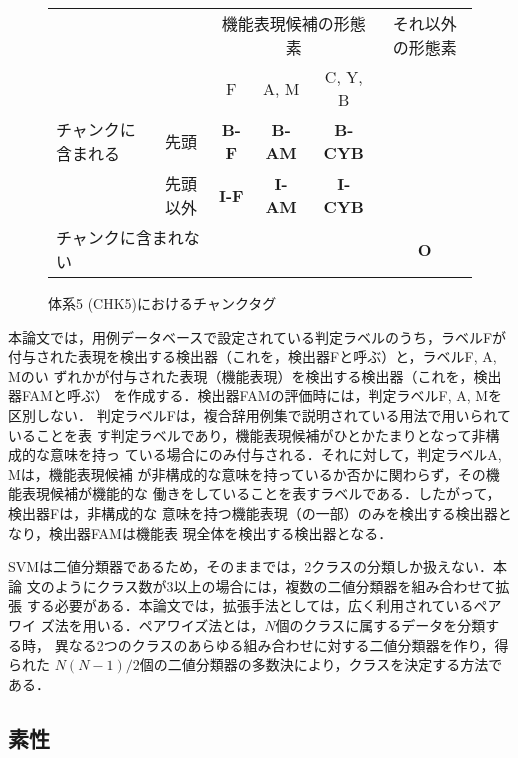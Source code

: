 \documentclass[japanese]{jnlp_1.2d}
\begin{document}
\begin{figure}
  \begin{center}
    \begin{tabular}{l|c||c|c|c|c}\hline
      \multicolumn{2}{c||}{} & \multicolumn{3}{c|}{機能表現候補の形態素} & それ以外の形態素 \\ \cline{3-5}
      \multicolumn{2}{c||}{} & F & A, M & C, Y, B & \\ \hline\hline
      チャンクに含まれる & 先頭 & {\bfseries B-F} & {\bfseries B-AM} & {\bfseries B-CYB} & \\ \cline{2-5}
      & 先頭以外 & {\bfseries I-F} & {\bfseries I-AM} & {\bfseries I-CYB} & \\ \hline
      \multicolumn{2}{l||}{チャンクに含まれない} & \multicolumn{3}{c|}{} & {\bfseries O} \\ \hline
    \end{tabular}
  \end{center}
    \vspace{8pt}
  \caption{体系5 (CHK5)におけるチャンクタグ}
  \label{fig:chunktag}
\vspace{-2pt}
\end{figure}

本論文では，用例データベースで設定されている判定ラベルのうち，ラベルFが
付与された表現を検出する検出器（これを，検出器Fと呼ぶ）と，ラベルF, A, Mのい
ずれかが付与された表現（機能表現）を検出する検出器（これを，検出器FAMと呼ぶ）
を作成する．検出器FAMの評価時には，判定ラベルF, A, Mを区別しない．
判定ラベルFは，複合辞用例集で説明されている用法で用いられていることを表
す判定ラベルであり，機能表現候補がひとかたまりとなって非構成的な意味を持っ
ている場合にのみ付与される．それに対して，判定ラベルA, Mは，機能表現候補
が非構成的な意味を持っているか否かに関わらず，その機能表現候補が機能的な
働きをしていることを表すラベルである．したがって，検出器Fは，非構成的な
意味を持つ機能表現（の一部）のみを検出する検出器となり，検出器FAMは機能表
現全体を検出する検出器となる．

SVMは二値分類器であるため，そのままでは，2クラスの分類しか扱えない．本論
文のようにクラス数が3以上の場合には，複数の二値分類器を組み合わせて拡張
する必要がある．本論文では，拡張手法としては，広く利用されているペアワイ
ズ法を用いる．ペアワイズ法とは，$N$個のクラスに属するデータを分類する時，
異なる2つのクラスのあらゆる組み合わせに対する二値分類器を作り，得られた
$N(N-1)/2$個の二値分類器の多数決により，クラスを決定する方法である．

\subsection{素性}
\label{subsec:feature}
\end{document}
